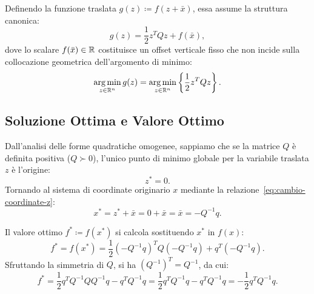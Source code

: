 Definendo la funzione traslata $g(z) \coloneqq f(z + \bar{x})$, essa assume la struttura canonica:
\begin{equation}
    g(z) = \frac{1}{2} z^T Q z + f(\bar{x}),
\end{equation}
dove lo scalare $f(\bar{x}) \in \mathbb{R}$ costituisce un offset verticale fisso che non incide sulla collocazione geometrica dell'argomento di minimo:
\begin{equation}
    \operatorname*{arg\,min}_{z \in \mathbb{R}^n} g(z) = \operatorname*{arg\,min}_{z \in \mathbb{R}^n} \left\{ \frac{1}{2} z^T Q z \right\}.
\end{equation}

\subsection{Soluzione Ottima e Valore Ottimo}
Dall'analisi delle forme quadratiche omogenee, sappiamo che se la matrice $Q$ \`e definita positiva ($Q \succ 0$), l'unico punto di minimo globale per la variabile traslata $z$ \`e l'origine:
\begin{equation}
    z^* = 0.
\end{equation}
Tornando al sistema di coordinate originario $x$ mediante la relazione~\eqref{eq:cambio-coordinate-z}:
\begin{equation}
    x^* = z^* + \bar{x} = 0 + \bar{x} = \bar{x} = -Q^{-1} q.
\end{equation}

Il valore ottimo $f^* \coloneqq f(x^*)$ si calcola sostituendo $x^*$ in $f(x)$:
\begin{equation}
    f^* = f(x^*) = \frac{1}{2} (-Q^{-1} q)^T Q (-Q^{-1} q) + q^T (-Q^{-1} q).
\end{equation}
Sfruttando la simmetria di $Q$, si ha $(Q^{-1})^T = Q^{-1}$, da cui:
\begin{equation}
    f^* = \frac{1}{2} q^T Q^{-1} Q Q^{-1} q - q^T Q^{-1} q = \frac{1}{2} q^T Q^{-1} q - q^T Q^{-1} q = -\frac{1}{2} q^T Q^{-1} q.
    \label{eq:valore-ottimo-non-singolare}
\end{equation}

